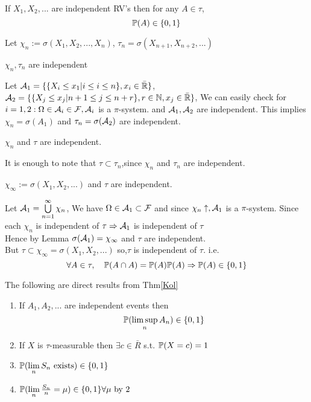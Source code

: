 \newpage
\begin{thm}\label{Kol} If $X_1, X_2, ...$ are independent RV's then for any $A \in \tau$, 
\begin{equation*}
    \mathbb{P}(A) \in \{0,1\}
\end{equation*}
\end{thm}
\pf Let $\chi_n :=\sigma(X_1, X_2, ...,X_n)$, $\tau_n = \sigma(X_{n+1}, X_{n+2}, ...)$
\begin{lem}
$\chi_n, \tau_n$ are independent
\end{lem}
\pf Let $\mathcal{A}_1 = \{\{X_i \leq x_1| i\leq i\leq n\}, x_i \in \bar{\mathbb{R}}\}$, $\mathcal{A}_2 = \{\{X_j \leq x_j| n+1\leq j\leq n+r\}, r\in \mathbb{N},x_j \in \bar{\mathbb{R}}\}$, We can easily check for $i = 1,2: \Omega \in \mathcal{A}_i \in \mathcal{F}, \mathcal{A}_i$ is a $\pi$-system. and $\mathcal{A}_1,\mathcal{A}_2$ are independent. This implies $\chi_n = \sigma(A_1)$ and $\tau_n = \sigma(\mathcal{A}_2)$ are independent. 
\begin{lem}
$\chi_n$ and $\tau$ are independent.
\end{lem}
\pf It is enough to note that $\tau \subset \tau_n$,since $\chi_n$ and $\tau_n$ are independent.
\begin{lem}
$\chi_\infty := \sigma(X_1, X_2, ...)$ and $\tau$ are independent.
\end{lem}
\pf Let $\mathcal{A}_1 = \bigcup\limits_{n=1}^\infty \chi_n$, We have $\Omega \in \mathcal{A}_1 \subset \mathcal{F}$ and since $\chi_n\uparrow, \mathcal{A}_1$ is a $\pi$-system. Since each $\chi_n$ is independent of $\tau \Rightarrow \mathcal{A}_1$ is independent of $\tau$ \\
Hence by Lemma $\sigma(\mathcal{A}_1) = \chi_\infty$ and $\tau$ are independent. \\
But $\tau \subset \chi_\infty = \sigma(X_1, X_2, ...)$ so,$\tau$ is independent of $\tau$. i.e.
\begin{equation*}
    \forall A\in \tau, \quad \mathbb{P}(A \cap A) = \mathbb{P}(A)\mathbb{P}(A) \Rightarrow \mathbb{P}(A) \in \{0,1\}
\end{equation*}
\begin{cor} The following are direct results from Thm\ref{Kol}
\begin{enumerate}
    \item If $A_1, A_2, ...$ are independent events then
    \begin{equation*}
        \mathbb{P}(\limsup\limits_{n}A_n)\in \{0,1\}
    \end{equation*}
    \item If $X$ is $\tau$-measurable then $\exists c\in \bar{R}$ s.t. $\mathbb{P}(X = c) = 1$
    \item $\mathbb{P}(\lim\limits_{n}S_n \text{ exists}) \in \{0,1\}$
    \item $\mathbb{P}(\lim\limits_{n}\frac{S_n}{n} = \mu) \in \{0,1\} \forall \mu \text{ by } 2$
\end{enumerate}
\end{cor}
\pf
